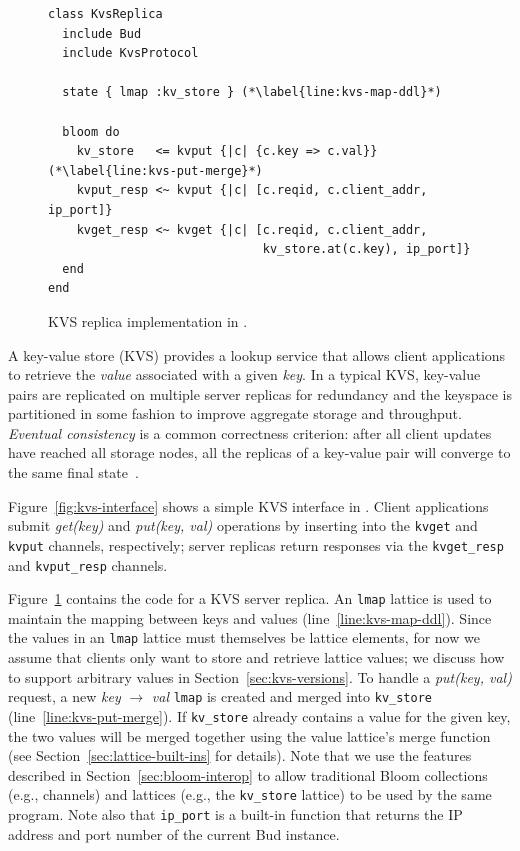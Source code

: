 \begin{figure}[t]
\begin{scriptsize}
\begin{lstlisting}
class KvsReplica
  include Bud
  include KvsProtocol

  state { lmap :kv_store } (*\label{line:kvs-map-ddl}*)

  bloom do
    kv_store   <= kvput {|c| {c.key => c.val}} (*\label{line:kvs-put-merge}*)
    kvput_resp <~ kvput {|c| [c.reqid, c.client_addr, ip_port]}
    kvget_resp <~ kvget {|c| [c.reqid, c.client_addr,
                              kv_store.at(c.key), ip_port]}
  end
end
\end{lstlisting}
\end{scriptsize}
\caption{KVS replica implementation in \lang.}
\label{fig:kvs-replica}
\end{figure}

A key-value store (KVS) provides a lookup service that allows client
applications to retrieve the \emph{value} associated with a given \emph{key}. In
a typical KVS, key-value pairs are replicated on multiple server replicas for
redundancy and the keyspace is partitioned in some fashion to improve aggregate
storage and throughput. \emph{Eventual consistency} is a common correctness
criterion: after all client updates have reached all storage nodes, all the
replicas of a key-value pair will converge to the same final
state~\cite{Terry1995,vogels}.

Figure~\ref{fig:kvs-interface} shows a simple KVS interface in \lang. Client
applications submit \emph{get(key)} and \emph{put(key, val)} operations by
inserting into the \texttt{kvget} and \texttt{kvput} channels, respectively;
server replicas return responses via the \texttt{kvget\_resp} and
\texttt{kvput\_resp} channels.

Figure~\ref{fig:kvs-replica} contains the \lang code for a KVS server
replica. An \texttt{lmap} lattice is used to maintain the mapping between keys
and values (line~\ref{line:kvs-map-ddl}). Since the values in an \texttt{lmap}
lattice must themselves be lattice elements, for now we assume that clients only
want to store and retrieve lattice values; we discuss how to support arbitrary
values in Section~\ref{sec:kvs-versions}. To handle a \emph{put(key, val)}
request, a new \emph{key} $\to$ \emph{val} \texttt{lmap} is created and merged
into \texttt{kv\_store} (line~\ref{line:kvs-put-merge}). If \texttt{kv\_store}
already contains a value for the given key, the two values will be merged
together using the value lattice's merge function (see
Section~\ref{sec:lattice-built-ins} for details). Note that we use the \lang
features described in Section~\ref{sec:bloom-interop} to allow traditional Bloom
collections (e.g., channels) and lattices (e.g., the \texttt{kv\_store} lattice)
to be used by the same program. Note also that \texttt{ip\_port} is a built-in
function that returns the IP address and port number of the current Bud
instance.

